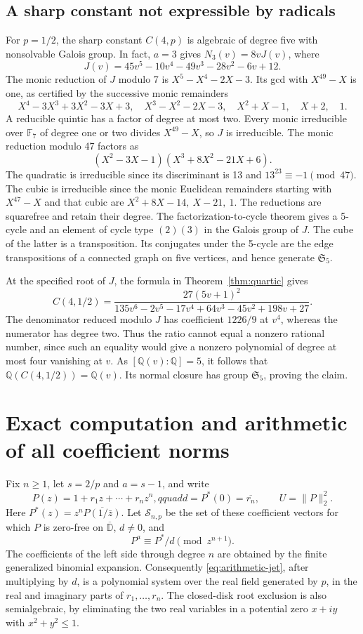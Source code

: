 \documentclass[11pt]{article}
\newcommand{\D}{\mathbb D}
\begin{document}
\subsection{A sharp constant not expressible by radicals}

For \(p=1/2\), the sharp constant \(C(4,p)\) is algebraic of degree
five with nonsolvable Galois group. In fact, \(a=3\) gives
\(N_3(v)=8vJ(v)\), where
\[
 J(v)=45v^5-10v^4-49v^3-28v^2-6v+12.
\]
The monic reduction of \(J\) modulo 7 is \(X^5-X^4-2X-3\).
Its gcd with \(X^{49}-X\) is one, as certified by the successive
monic remainders
\[
 X^4-3X^3+3X^2-3X+3,\quad
 X^3-X^2-2X-3,\quad X^2+X-1,\quad X+2,\quad 1 .
\]
A reducible quintic has a factor of degree at most two.
Every monic irreducible over \(\mathbb F_7\) of degree one
or two divides \(X^{49}-X\), so \(J\) is irreducible.
The monic reduction modulo 47 factors as
\[
 (X^2-3X-1)(X^3+8X^2-21X+6).
\]
The quadratic is irreducible since its discriminant is 13 and
\(13^{23}\equiv-1\pmod {47}\).
The cubic is irreducible since the monic Euclidean remainders
starting with \(X^{47}-X\) and that cubic are
\(X^2+8X-14,\ X-21,\ 1\).
The reductions are squarefree and retain their degree. The
factorization-to-cycle theorem gives a 5-cycle and an element
of cycle type \((2)(3)\) in the Galois group of \(J\).
The cube of the latter is a transposition.
Its conjugates under the 5-cycle are the edge transpositions
of a connected graph on five vertices, and hence generate
\(\mathfrak S_5\).

At the specified root of \(J\), the formula in
Theorem~\ref{thm:quartic} gives
\[
 C(4,1/2)=
 \frac{27(5v+1)^2}{135v^6-2v^5-17v^4+64v^3-45v^2+198v+27}.
\]
The denominator reduced modulo \(J\) has coefficient \(1226/9\)
at \(v^4\), whereas the numerator has degree two.
Thus the ratio cannot equal a nonzero rational number, since
such an equality would give a nonzero polynomial of degree
at most four vanishing at \(v\). As \([\mathbb Q(v):\mathbb Q]=5\),
it follows that \(\mathbb Q(C(4,1/2))=\mathbb Q(v)\).
Its normal closure has group \(\mathfrak S_5\), proving the claim.
\section{Exact computation and arithmetic of all coefficient norms}\label{sec:arithmetic}

Fix \(n\geq1\), let \(s=2/p\) and \(a=s-1\), and write
\[
 P(z)=1+r_1z+\cdots+r_nz^n,qquad
 d=P^*(0)=\overline{r_n},\qquad U=\|P\|_2^2 .
\]
Here \(P^*(z)=z^n\overline{P(1/\bar z)}\). Let \(\mathcal S_{n,p}\)
be the set of these coefficient vectors for which \(P\) is zero-free
on \(\overline{\D}\), \(d\ne0\), and
\begin{equation}\label{eq:arithmetic-jet}
 P^a\equiv P^*/d\pmod{z^{n+1}} .
\end{equation}
The coefficients of the left side through degree \(n\) are obtained
by the finite generalized binomial expansion. Consequently
\eqref{eq:arithmetic-jet}, after multiplying by \(d\), is a polynomial
system over the real field generated by \(p\), in the real and
imaginary parts of \(r_1,\ldots,r_n\). The closed-disk root exclusion
is also semialgebraic, by eliminating the two real variables in a
potential zero \(x+iy\) with \(x^2+y^2\leq1\).
\end{document}
